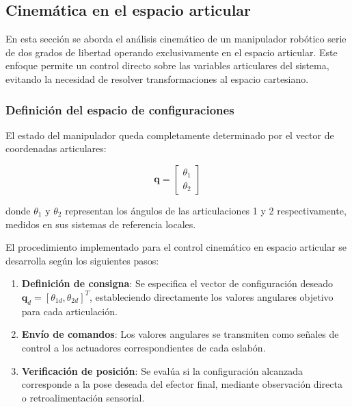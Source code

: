\subsection{Cinemática en el espacio articular}

En esta sección se aborda el análisis cinemático de un manipulador robótico serie de dos grados de libertad operando exclusivamente en el espacio articular. Este enfoque permite un control directo sobre las variables articulares del sistema, evitando la necesidad de resolver transformaciones al espacio cartesiano.

\subsubsection{Definición del espacio de configuraciones}

El estado del manipulador queda completamente determinado por el vector de coordenadas articulares:

\begin{equation}
\mathbf{q} = \begin{bmatrix} \theta_1 \\ \theta_2 \end{bmatrix}
\end{equation}

donde $\theta_1$ y $\theta_2$ representan los ángulos de las articulaciones 1 y 2 respectivamente, medidos en sus sistemas de referencia locales.

El procedimiento implementado para el control cinemático en espacio articular se desarrolla según los siguientes pasos:

\begin{enumerate}
    \item \textbf{Definición de consigna}: Se especifica el vector de configuración deseado $\mathbf{q}_d = [\theta_{1d}, \theta_{2d}]^T$, estableciendo directamente los valores angulares objetivo para cada articulación.
    
    \item \textbf{Envío de comandos}: Los valores angulares se transmiten como señales de control a los actuadores correspondientes de cada eslabón.
    
    \item \textbf{Verificación de posición}: Se evalúa si la configuración alcanzada corresponde a la pose deseada del efector final, mediante observación directa o retroalimentación sensorial.
\end{enumerate}

